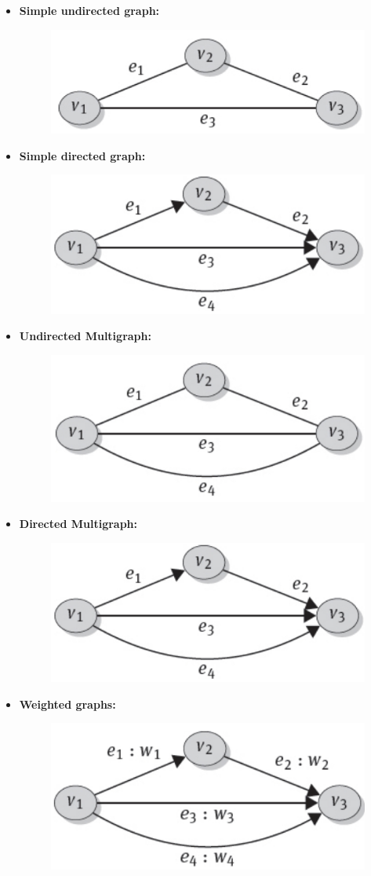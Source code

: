 \begin{itemize}
    \item \textbf{Simple undirected graph:}
    \begin{figure}[!h]
        \centering
        \includegraphics[width=0.35\linewidth]{images/AdvancedDataManagment/graph_databases/simple_undirected_graph.jpeg}
    \end{figure}
    
    \item \textbf{Simple directed graph:}
    \begin{figure}[!h]
        \centering
        \includegraphics[width=0.35\linewidth]{images/AdvancedDataManagment/graph_databases/directed_multigraph.jpeg}
    \end{figure}
    
    \item \textbf{Undirected Multigraph:}
    \begin{figure}[!h]
        \centering
        \includegraphics[width=0.35\linewidth]{images/AdvancedDataManagment/graph_databases/undirected_multigraph.jpeg}
    \end{figure}
    
    \item \textbf{Directed Multigraph:}
    \begin{figure}[!h]
        \centering
        \includegraphics[width=0.35\linewidth]{images/AdvancedDataManagment/graph_databases/directed_multigraph.jpeg}
    \end{figure}
    
    \item \textbf{Weighted graphs:}
    \begin{figure}[!h]
        \centering
        \includegraphics[width=0.35\linewidth]{images/AdvancedDataManagment/graph_databases/weighted_graph.jpeg}
    \end{figure}
\end{itemize}


